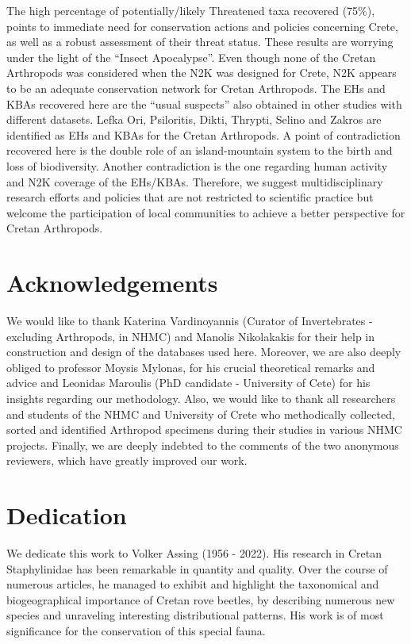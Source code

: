 The high percentage of potentially/likely Threatened taxa recovered (75\%),
points to immediate need for conservation actions and policies concerning Crete,
as well as a robust assessment of their threat status. These results are
worrying under the light of the “Insect Apocalypse”. Even though none of the
Cretan Arthropods was considered when the N2K was designed for Crete, N2K
appears to be an adequate conservation network for Cretan Arthropods. The EHs
and KBAs recovered here are the “usual suspects” also obtained in other studies
with different datasets. Lefka Ori, Psiloritis, Dikti, Thrypti, Selino and
Zakros are identified as EHs and KBAs for the Cretan Arthropods. A point of
contradiction recovered here is the double role of an island-mountain system to
the birth and loss of biodiversity. Another contradiction is the one regarding
human activity and N2K coverage of the EHs/KBAs. Therefore, we suggest
multidisciplinary research efforts and policies that are not restricted to
scientific practice but welcome the participation of local communities to
achieve a better perspective for Cretan Arthropods.

\section*{Acknowledgements}
We would like to thank Katerina Vardinoyannis (Curator of Invertebrates - excluding Arthropods, in NHMC) and
Manolis Nikolakakis for their help in construction and design of the databases
used here. Moreover, we are also deeply obliged to professor Moysis Mylonas,
for his crucial theoretical remarks and advice and Leonidas Maroulis (PhD candidate - University of Cete)
for his insights regarding our methodology. Also, we would like to thank all
researchers and students of the NHMC and University of Crete who methodically
collected, sorted and identified Arthropod specimens during their studies in
various NHMC projects. Finally, we are deeply indebted to the comments of the
two anonymous reviewers, which have greatly improved our work.

\section*{Dedication}
We dedicate this work to Volker Assing (1956 - 2022). His research in Cretan
Staphylinidae has been remarkable in quantity and quality. Over the course of
numerous articles, he managed to exhibit and highlight the taxonomical and
biogeographical importance of Cretan rove beetles, by describing numerous new
species and unraveling interesting distributional patterns. His work is of most
significance for the conservation of this special fauna.

